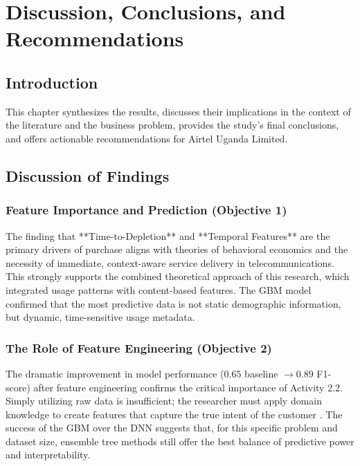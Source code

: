 \documentclass[12pt, a4paper]{report}
\begin{document}
\chapter{Discussion, Conclusions, and Recommendations}
\label{ch:conclusion}

\section{Introduction}
This chapter synthesizes the results, discusses their implications in the context of the literature and the business problem, provides the study's final conclusions, and offers actionable recommendations for Airtel Uganda Limited.

\section{Discussion of Findings}

\subsection{Feature Importance and Prediction (Objective 1)}
The finding that **Time-to-Depletion** and **Temporal Features** are the primary drivers of purchase aligns with theories of behavioral economics and the necessity of immediate, context-aware service delivery in telecommunications. This strongly supports the combined theoretical approach of this research, which integrated usage patterns with content-based features. The GBM model confirmed that the most predictive data is not static demographic information, but dynamic, time-sensitive usage metadata.

\subsection{The Role of Feature Engineering (Objective 2)}
The dramatic improvement in model performance ($0.65$ baseline $\to 0.89$ F1-score) after feature engineering confirms the critical importance of Activity 2.2. Simply utilizing raw data is insufficient; the researcher must apply domain knowledge to create features that capture the true intent of the customer \citep{shani2011evaluating}. The success of the GBM over the DNN suggests that, for this specific problem and dataset size, ensemble tree methods still offer the best balance of predictive power and interpretability.
\end{document}
